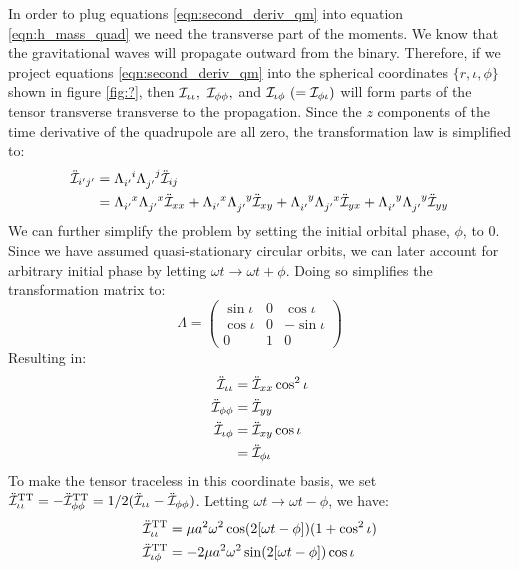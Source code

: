 In order to plug equations \ref{eqn:second_deriv_qm} into equation \ref{eqn:h_mass_quad} we need the transverse part of the moments. We know that the gravitational waves will propagate outward from the binary. Therefore, if we project equations \ref{eqn:second_deriv_qm} into the spherical coordinates $\{r,\iota,\phi\}$ shown in figure \ref{fig:?}, then $\mathcal{I}_{\iota\iota},~\mathcal{I}_{\phi\phi},$ and $\mathcal{I}_{\iota\phi}~ (= \mathcal{I}_{\phi\iota})$ will form parts of the tensor transverse transverse to the propagation. Since the $z$ components of the time derivative of the quadrupole are all zero, the transformation law is simplified to:
\begin{align*}
\ddot{\qI}_{i'j'}  &= \Lambda\indices{_{i'}^i} \Lambda\indices{_{j'}^j} \ddot{\qI}_{ij} \\
            &= \Lambda\indices{_{i'}^x} \Lambda\indices{_{j'}^x} \ddot{\qI}_{xx} + \Lambda\indices{_{i'}^x} \Lambda\indices{_{j'}^y} \ddot{\qI}_{xy} + \Lambda\indices{_{i'}^y} \Lambda\indices{_{j'}^x} \ddot{\qI}_{yx} + \Lambda\indices{_{i'}^y} \Lambda\indices{_{j'}^y} \ddot{\qI}_{yy}
\end{align*}
We can further simplify the problem by setting the initial orbital phase, $\phi$, to 0. Since we have assumed quasi-stationary circular orbits, we can later account for arbitrary initial phase by letting $\omega t \rightarrow \omega t + \phi$. Doing so simplifies the transformation matrix to:
\begin{equation*}
\Lambda = \begin{pmatrix}
    \sin \iota &    0    &  \cos \iota \\
    \cos \iota &    0    &  -\sin \iota \\
         0     &    1    &    0
    \end{pmatrix}
\end{equation*}
Resulting in:
\begin{align*}
\ddot{\mathcal{I}}_{\iota\iota} &= \ddot{\mathcal{I}}_{xx} \cos^2\iota \\
\ddot{\mathcal{I}}_{\phi\phi}   &= \ddot{\mathcal{I}}_{yy} \\
\ddot{\mathcal{I}}_{\iota\phi}  &= \ddot{\mathcal{I}}_{xy} \cos \iota \\
                        &= \ddot{\mathcal{I}}_{\phi\iota}
\end{align*}
To make the tensor traceless in this coordinate basis, we set $\ddot{\mathcal{I}}^{\mathrm{TT}}_{\iota\iota} = -\ddot{\mathcal{I}}^{\mathrm{TT}}_{\phi\phi} = 1/2(\ddot{\mathcal{I}}_{\iota\iota} - \ddot{\mathcal{I}}_{\phi\phi})$. Letting $\omega t \rightarrow \omega t - \phi$, we have:
\begin{align}
\ddot{\mathcal{I}}^{\mathrm{TT}}_{\iota\iota} &= \mu a^2 \omega^2 \cos(2[\omega t - \phi])(1 + \cos^2\iota) \\
\ddot{\mathcal{I}}^{\mathrm{TT}}_{\iota\phi}  &= -2 \mu a^2 \omega^2 \sin(2[\omega t - \phi])\cos\iota
\end{align}

